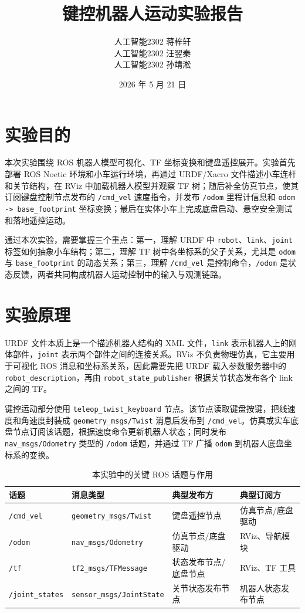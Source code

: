 \documentclass[11pt,a4paper,fontset=fandol]{ctexart}
\title{\bfseries 键控机器人运动实验报告}
\author{人工智能2302 \quad 蒋梓轩\\
人工智能2302 \quad 汪翌秦\\
人工智能2302 \quad 孙靖淞}
\date{2026 年 5 月 21 日}
\begin{document}
\maketitle

\section{实验目的}

本次实验围绕 ROS 机器人模型可视化、TF 坐标变换和键盘遥控展开。实验首先部署 ROS Noetic 环境和小车运行环境，再通过 URDF/Xacro 文件描述小车连杆和关节结构，在 RViz 中加载机器人模型并观察 TF 树；随后补全仿真节点，使其订阅键盘控制节点发布的 \verb|/cmd_vel| 速度指令，并发布 \verb|/odom| 里程计信息和 \verb|odom -> base_footprint| 坐标变换；最后在实体小车上完成底盘启动、悬空安全测试和落地遥控运动。

通过本次实验，需要掌握三个重点：第一，理解 URDF 中 \verb|robot|、\verb|link|、\verb|joint| 标签如何抽象小车结构；第二，理解 TF 树中各坐标系的父子关系，尤其是 \verb|odom| 与 \verb|base_footprint| 的动态关系；第三，理解 \verb|/cmd_vel| 是控制命令，\verb|/odom| 是状态反馈，两者共同构成机器人运动控制中的输入与观测链路。

\section{实验原理}

URDF 文件本质上是一个描述机器人结构的 XML 文件，\verb|link| 表示机器人上的刚体部件，\verb|joint| 表示两个部件之间的连接关系。RViz 不负责物理仿真，它主要用于可视化 ROS 消息和坐标系关系，因此需要先把 URDF 载入参数服务器中的 \verb|robot_description|，再由 \verb|robot_state_publisher| 根据关节状态发布各个 link 之间的 TF。

键控运动部分使用 \verb|teleop_twist_keyboard| 节点。该节点读取键盘按键，把线速度和角速度封装成 \verb|geometry_msgs/Twist| 消息后发布到 \verb|/cmd_vel|。仿真或实车底盘节点订阅该话题，根据速度命令更新机器人状态；同时发布 \verb|nav_msgs/Odometry| 类型的 \verb|/odom| 话题，并通过 TF 广播 \verb|odom| 到机器人底盘坐标系的变换。

\begin{table}[H]
  \centering
  \caption{本实验中的关键 ROS 话题与作用}
  \begin{tabular}{llll}
    \toprule
    话题 & 消息类型 & 典型发布方 & 典型订阅方 \\
    \midrule
    \verb|/cmd_vel| & \verb|geometry_msgs/Twist| & 键盘遥控节点 & 仿真节点/底盘驱动 \\
    \verb|/odom| & \verb|nav_msgs/Odometry| & 仿真节点/底盘驱动 & RViz、导航模块 \\
    \verb|/tf| & \verb|tf2_msgs/TFMessage| & 状态发布节点/底盘节点 & RViz、TF 工具 \\
    \verb|/joint_states| & \verb|sensor_msgs/JointState| & 关节状态发布节点 & 机器人状态发布节点 \\
    \bottomrule
  \end{tabular}
  \label{tab:topics}
\end{table}
\end{document}

